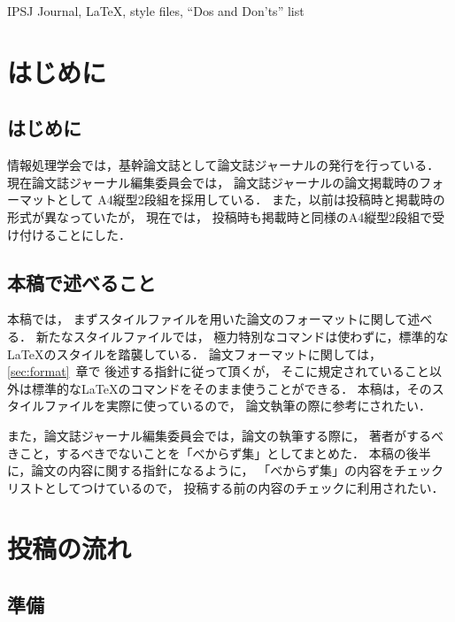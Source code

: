 \documentclass[submit, uplatex]{ipsj}
\begin{document}
\begin{ekeyword}
IPSJ Journal, \LaTeX, style files, ``Dos and Don'ts'' list
\end{ekeyword}

\maketitle

\section{はじめに}
\subsection{はじめに}

情報処理学会では，基幹論文誌として論文誌ジャーナルの発行を行っている．
現在論文誌ジャーナル編集委員会では，
論文誌ジャーナルの論文掲載時のフォーマットとして
A4縦型2段組を採用している．
また，以前は投稿時と掲載時の形式が異なっていたが，
現在では，
投稿時も掲載時と同様のA4縦型2段組で受け付けることにした．


\subsection{本稿で述べること}
本稿では，
まずスタイルファイルを用いた論文のフォーマットに関して述べる．
新たなスタイルファイルでは，
極力特別なコマンドは使わずに，標準的な \LaTeX のスタイルを踏襲している．
論文フォーマットに関しては，\ref{sec:format}~章で
後述する指針に従って頂くが，
そこに規定されていること以外は標準的な\LaTeX のコマンドをそのまま使うことができる．
本稿は，そのスタイルファイルを実際に使っているので，
論文執筆の際に参考にされたい．





また，論文誌ジャーナル編集委員会では，論文の執筆する際に，
著者がするべきこと，するべきでないことを「べからず集」としてまとめた．
本稿の後半に，論文の内容に関する指針になるように，
「べからず集」の内容をチェックリストとしてつけているので，
投稿する前の内容のチェックに利用されたい．




\section{投稿の流れ}


\subsection{準備}
\end{document}
